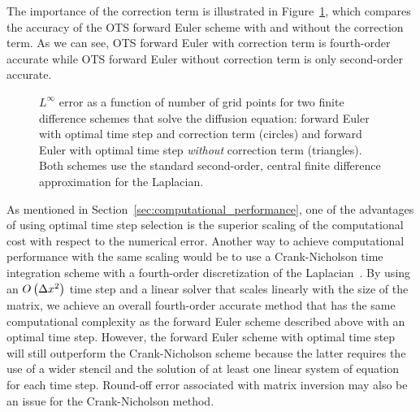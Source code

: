 \documentclass[fleqn,12pt,twoside]{article}
\begin{document}
The importance of the correction term is illustrated in 
Figure~\ref{fig:diffusion_eqn_1d_src_error}, which compares the accuracy of 
the OTS forward Euler scheme with and without the correction term.  As we 
can see, OTS forward Euler with correction term is fourth-order accurate 
while OTS forward Euler without correction term is only second-order 
accurate.  

\begin{figure}[tb]
\begin{center}
\caption{$L^\infty$ error as a function of number of grid points for 
two finite difference schemes that solve the diffusion equation: 
forward Euler with optimal time step and correction term (circles) and 
forward Euler with optimal time step \emph{without} correction term 
(triangles).  Both schemes use the standard second-order, central finite 
difference approximation for the Laplacian.
}
\label{fig:diffusion_eqn_1d_src_error}
\end{center}
\end{figure}

As mentioned in Section~\ref{sec:computational_performance}, one of the 
advantages of using optimal time step selection is the superior scaling of 
the computational cost with respect to the numerical error.  
Another way to achieve computational performance with the same scaling would 
be to use a Crank-Nicholson time integration scheme with a fourth-order 
discretization of the Laplacian~\cite{gibou_2005}.  By using an 
$O\left(\Delta x^2 \right)$ time step and a linear solver that scales linearly 
with the size of the matrix, we achieve an overall fourth-order accurate 
method that has the same computational complexity as the forward Euler scheme
described above with an optimal time step.  However, the forward Euler scheme 
with optimal time step will still outperform the Crank-Nicholson scheme 
because the latter requires the use of a wider stencil and the solution of 
at least one linear system of equation for each time step.  Round-off error
associated with matrix inversion may also be an issue for the Crank-Nicholson 
method.
\end{document}
